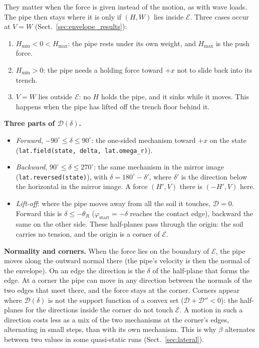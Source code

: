 \documentclass[11pt,a4paper]{article}
\begin{document}
They matter when the force is given instead of the motion, as with
wave loads.  The pipe then stays where it is only if $(H, W)$ lies
inside $\mathcal{E}$.  Three cases occur at $V = W$
(Sect.~\ref{sec:envelope_results}):
\begin{enumerate}
  \item $H_\text{min} < 0 < H_\text{max}$: the pipe rests under its
    own weight, and $H_\text{max}$ is the push force.
  \item $H_\text{min} > 0$: the pipe needs a holding force toward $+x$
    not to slide back into its trench.
  \item $V = W$ lies outside $\mathcal{E}$: no $H$ holds the pipe, and
    it sinks while it moves.  This happens when the pipe has lifted off
    the trench floor behind it.
\end{enumerate}

\textbf{Three parts of $\mathcal{D}(\delta)$.}
\begin{itemize}
  \item \emph{Forward}, $-90^\circ \le \delta \le 90^\circ$: the
    one-sided mechanism toward $+x$ on the state
    (\texttt{lat.field(state, delta, lat.omega\_r)}).
  \item \emph{Backward}, $90^\circ \le \delta \le 270^\circ$: the same
    mechanism in the mirror image (\texttt{lat.reversed(state)}),
    with $\delta = 180^\circ - \delta'$, where $\delta'$ is the
    direction below the horizontal in the mirror image.  A force
    $(H', V)$ there is $(-H', V)$ here.
  \item \emph{Lift-off}: where the pipe moves away from all the soil
    it touches, $\mathcal{D} = 0$.  Forward this is
    $\delta \le -\theta_R$ ($\varphi_\text{start} = -\delta$ reaches the
    contact edge), backward the same on the other side.  These
    half-planes pass through the origin: the soil carries no tension,
    and the origin is a corner of $\mathcal{E}$.
\end{itemize}

\textbf{Normality and corners.}  When the force lies on the boundary of
$\mathcal{E}$, the pipe moves along the outward normal there (the
pipe's velocity is then the normal of the envelope).  On an edge the
direction is the $\delta$ of the half-plane that forms the edge.  At a
corner the pipe can move in any direction between the normals of the
two edges that meet there, and the force stays at the corner.
Corners appear where $\mathcal{D}(\delta)$ is not the support function
of a convex set ($\mathcal{D} + \mathcal{D}'' < 0$): the half-planes
for the directions inside the corner do not touch $\mathcal{E}$.  A
motion in such a direction costs less as a mix of the two mechanisms
at the corner's edges, alternating in small steps, than with its own
mechanism.  This is why $\beta$ alternates between two values in some
quasi-static runs (Sect.~\ref{sec:lateral}).
\end{document}
